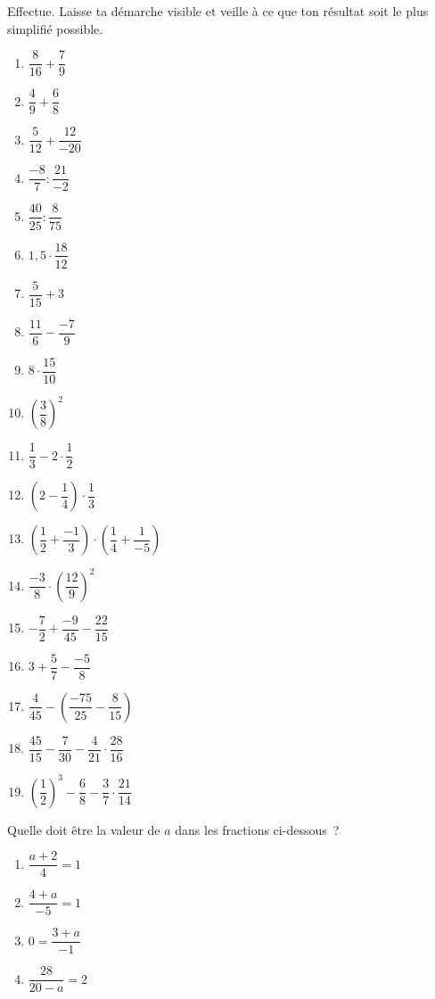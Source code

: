 \documentclass[../math2.tex]{subfiles}
\begin{document}
\begin{exercise}
  Effectue. Laisse ta démarche visible et veille à ce que ton résultat soit le plus simplifié possible.
  \begin{enumerate}[cols=3]
    \item $\dfrac{8}{16}+\dfrac{7}{9}$
    \item $\dfrac{4}{9}+\dfrac{6}{8}$
    \item $\dfrac{5}{12}+\dfrac{12}{-20}$
    \item $\dfrac{-8}{7} : \dfrac{21}{-2}$
    \item $\dfrac{40}{25} : \dfrac{8}{75}$
    \item $1,5\cdot \dfrac{18}{12}$
    \item $\dfrac{5}{15} + 3$
    \item $\dfrac{11}{6} - \dfrac{-7}{9}$
    \item $8 \cdot \dfrac{15}{10}$
    \item $\left(\dfrac{3}{8}\right)^2$
    \item $\dfrac{1}{3}-2\cdot\dfrac{1}{2}$
    \item $\left(2-\dfrac{1}{4}\right) \cdot \dfrac{1}{3}$
    \item $\left(\dfrac{1}{2}+\dfrac{-1}{3}\right) \cdot \left(\dfrac{1}{4}+\dfrac{1}{-5}\right)$
    \item $\dfrac{-3}{8}\cdot \left(\dfrac{12}{9}\right)^2$
    \item $-\dfrac{7}{2}+\dfrac{-9}{45} - \dfrac{22}{15}$
    \item $3+\dfrac{5}{7} - \dfrac{-5}{8}$
    \item $\dfrac{4}{45}-\left(\dfrac{-75}{25} - \dfrac{8}{15}\right)$
    \item $\dfrac{45}{15}-\dfrac{7}{30} - \dfrac{4}{21}\cdot \dfrac{28}{16}$
    \item $\left(\dfrac{1}{2}\right)^3 - \dfrac{6}{8} - \dfrac{3}{7} \cdot \dfrac{21}{14}$
  \end{enumerate}
\end{exercise}


\begin{exercise}
  Quelle doit être la valeur de \(a\) dans les fractions ci-dessous~?
  \begin{enumerate}[cols=2]
    \item $\dfrac{a+2}{4}=1$
    \item $\dfrac{4+a}{-5}=1$
    \item $0=\dfrac{3+a}{-1}$
    \item $\dfrac{28}{20-a}=2$
  \end{enumerate}
\end{exercise}
\end{document}
